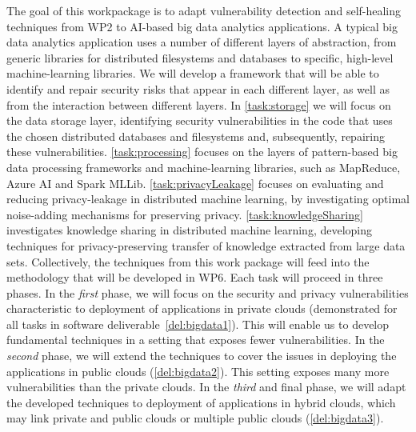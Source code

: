 \begin{Workpackage}{\thewpno}
\begin{WPDescription}
The goal of this workpackage is to adapt vulnerability detection and self-healing techniques from WP2 to AI-based big data analytics applications. A typical big data analytics application uses a number of different layers of abstraction, from generic libraries for distributed filesystems and databases to specific, high-level machine-learning libraries. We will develop a framework that will be able to identify and repair security risks that appear in each different layer, as well as from the interaction between different layers. In  \ref{task:storage} we will focus on the data storage layer, identifying security vulnerabilities in the code that uses the chosen distributed databases and filesystems and, subsequently, repairing these vulnerabilities. %
\ref{task:processing} focuses on the layers of pattern-based big data processing frameworks and machine-learning libraries, such as MapReduce, Azure AI and Spark MLLib. \ref{task:privacyLeakage} focuses on evaluating and reducing privacy-leakage in distributed machine learning, by investigating optimal noise-adding mechanisms for preserving privacy. \ref{task:knowledgeSharing} investigates knowledge sharing in distributed machine learning, developing techniques for privacy-preserving transfer of knowledge extracted from large data sets. Collectively, the techniques from this work package will feed into the \TheProject{} methodology that will be developed in WP6. Each task will proceed in three phases. In the \emph{first} phase, we will focus on the security and privacy vulnerabilities characteristic to deployment of applications in private clouds (demonstrated for all tasks in software deliverable~\ref{del:bigdata1}). This will enable us to develop fundamental techniques in a setting that exposes fewer vulnerabilities. In the \emph{second} phase, we will extend the techniques to cover the issues in deploying the applications in public clouds (\ref{del:bigdata2}). This setting exposes many more vulnerabilities than the private clouds. In the \emph{third} and final phase, we will adapt the developed techniques to deployment of applications in hybrid clouds, which may link private and public clouds or multiple public clouds (\ref{del:bigdata3}). 
\end{WPDescription}

\begin{Task}


\end{Task}
\end{Workpackage}
